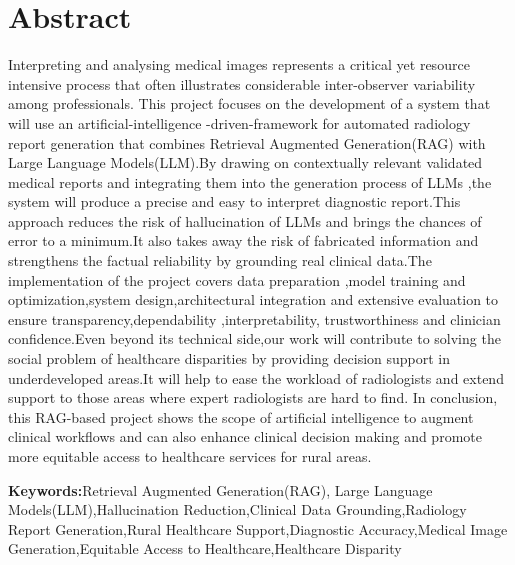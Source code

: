 \section*{Abstract}
Interpreting and analysing medical images represents a critical yet resource intensive process that often illustrates considerable inter-observer variability among professionals. This project focuses on the development of a system that will use an artificial-intelligence -driven-framework for automated radiology report generation  that combines Retrieval Augmented Generation(RAG) with Large Language Models(LLM).By drawing on contextually relevant validated medical reports and integrating them into the generation process of LLMs ,the system will produce a precise and easy to interpret diagnostic report.This approach reduces the risk of hallucination of LLMs and brings the chances of error to a minimum.It also takes away the risk of fabricated information and strengthens the factual reliability by grounding real clinical data.The implementation of the project covers data preparation ,model training and optimization,system design,architectural integration and extensive evaluation to ensure transparency,dependability ,interpretability, trustworthiness and clinician confidence.Even beyond its technical side,our work will contribute to solving the social problem of  healthcare disparities by providing decision support in underdeveloped areas.It will help to ease the workload of radiologists and extend support to those areas where expert radiologists are hard to find. In conclusion, this RAG-based project  shows the scope of artificial intelligence to augment clinical workflows and can also enhance clinical decision making and promote more equitable access to healthcare services for rural areas. 









\vspace{1cm}
\textbf{Keywords:}Retrieval Augmented Generation(RAG), Large Language Models(LLM),Hallucination Reduction,Clinical Data Grounding,Radiology Report Generation,Rural Healthcare Support,Diagnostic Accuracy,Medical Image Generation,Equitable Access to Healthcare,Healthcare Disparity
\pagebreak
